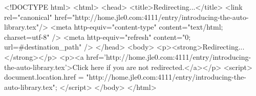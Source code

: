 <!DOCTYPE html>
<html>
<head>
<title>Redirecting...</title>
<link rel="canonical" href="http://home.jle0.com:4111/entry/introducing-the-auto-library.tex"/>
<meta http-equiv="content-type" content="text/html; charset=utf-8" />
<meta http-equiv="refresh" content="0; url=#{destination_path}" />
</head>
<body>
  <p><strong>Redirecting...</strong></p>
  <p><a href='http://home.jle0.com:4111/entry/introducing-the-auto-library.tex'>Click here if you are not redirected.</a></p>
  <script>
    document.location.href = "http://home.jle0.com:4111/entry/introducing-the-auto-library.tex";
  </script>
</body>
</html>
